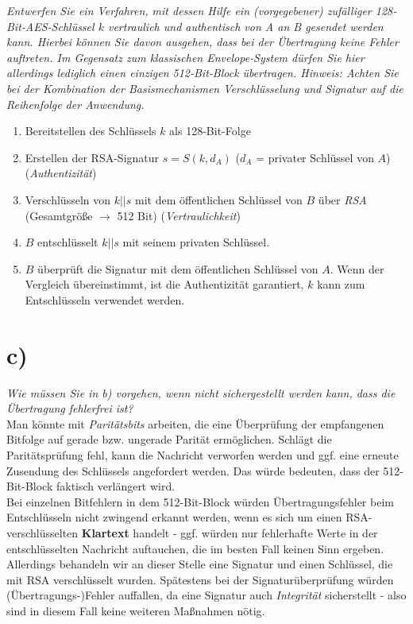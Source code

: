 \textit{Entwerfen Sie ein Verfahren, mit dessen Hilfe ein (vorgegebener) zufälliger 128‐
Bit‐AES‐Schlüssel $k$ vertraulich und authentisch von A an B gesendet werden
kann. Hierbei können Sie davon ausgehen, dass bei der Übertragung keine Fehler
auftreten. Im Gegensatz zum klassischen Envelope‐System dürfen Sie hier allerdings lediglich einen einzigen 512‐Bit‐Block übertragen.
Hinweis: Achten Sie bei der Kombination der Basismechanismen Verschlüsselung und Signatur auf die Reihenfolge der Anwendung.}\\

\noindent

\begin{enumerate}
    \itemsep0.5em
    \item Bereitstellen des Schlüssels $k$ als 128-Bit-Folge
    \item Erstellen der RSA-Signatur $s = S(k, d_A)$ ($d_A$ = privater Schlüssel von $A$) (\textit{Authentizität})
    \item Verschlüsseln von $k||s$ mit dem öffentlichen Schlüssel von $B$ über \textit{RSA} (Gesamtgröße $\rightarrow$ 512 Bit) (\textit{Vertraulichkeit})
    \item $B$ entschlüsselt $k||s$ mit seinem privaten Schlüssel.
    \item $B$ überprüft die Signatur mit dem öffentlichen Schlüssel von $A$.
    Wenn der Vergleich übereinstimmt, ist die Authentizität garantiert, $k$ kann zum Entschlüsseln verwendet werden.
\end{enumerate}

\section{c)}

\textit{Wie müssen Sie in b) vorgehen, wenn nicht sichergestellt werden kann, dass die
Übertragung fehlerfrei ist?}\\

\noindent
Man könnte mit \textit{Paritätsbits} arbeiten, die eine Überprüfung der empfangenen Bitfolge auf gerade bzw. ungerade Parität ermöglichen.
Schlägt die Paritätsprüfung fehl, kann die Nachricht verworfen werden und ggf. eine erneute Zusendung des Schlüssels angefordert werden.
Das würde bedeuten, dass der 512-Bit-Block faktisch verlängert wird.\\

\noindent
Bei einzelnen Bitfehlern in dem 512-Bit-Block würden Übertragungsfehler beim Entschlüsseln nicht zwingend erkannt werden, wenn es sich um einen RSA-verschlüsselten \textbf{Klartext} handelt - ggf. würden nur fehlerhafte Werte in der entschlüsselten Nachricht auftauchen, die im besten Fall keinen Sinn ergeben.\\
Allerdings behandeln wir an dieser Stelle eine Signatur und einen Schlüssel, die mit RSA verschlüsselt wurden.
Spätestens bei der Signaturüberprüfung würden (Übertragungs-)Fehler auffallen, da eine Signatur auch \textit{Integrität} sicherstellt - also sind in diesem Fall keine weiteren Maßnahmen nötig.
